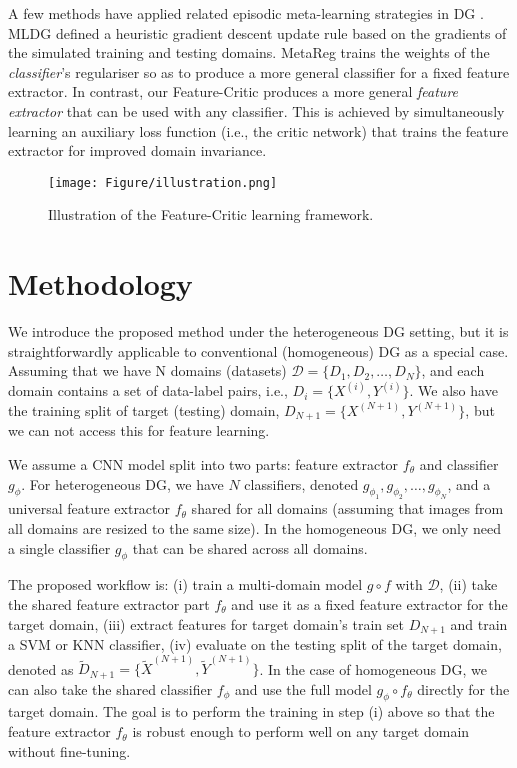 \documentclass{article}
\newcommand{\modelname}{Feature-Critic}
\begin{document}
A few methods have applied related episodic meta-learning strategies in DG \cite{Li18,Balaji18}. MLDG \cite{Li18} defined a heuristic gradient descent update rule based on the gradients of the simulated training and testing domains. MetaReg \cite{Balaji18} trains the weights of the \emph{classifier}'s regulariser so as to produce a more general classifier for a fixed feature extractor. In contrast,  our \modelname{} produces a more general \emph{feature extractor} that can be used with any classifier. This is achieved by simultaneously learning an auxiliary loss function \cite{gygli2017deepValueNet,yang2017metacritic} (i.e., the critic network) that trains the feature extractor for improved domain invariance.

\begin{figure}[t]
\centering
\texttt{[image: Figure/illustration.png]}
\caption{Illustration of the \modelname{} learning framework.} \label{fig:illu}
\vspace{-1.0em}
\end{figure}


\section{Methodology}

We  introduce the proposed method under the heterogeneous DG setting, but it is straightforwardly applicable to conventional (homogeneous) DG as a special case. Assuming that we have N domains (datasets) $\mathcal{D}=\{D_1, D_2, \dots, D_N\}$, and each domain contains a set of data-label pairs, i.e., $D_i=\{X^{(i)}, Y^{(i)}\}$. We also have the training split of target (testing) domain, $D_{N+1}=\{X^{(N+1)}, Y^{(N+1)}\}$, but  we can not access this for feature learning. 

We assume a CNN model split into two parts: feature extractor $f_\theta$ and classifier $g_\phi$. For heterogeneous DG, we have $N$ classifiers, denoted $g_{\phi_1}, g_{\phi_2}, \dots, g_{\phi_N}$, and a universal feature extractor $f_\theta$  shared for all domains (assuming that images from all domains are resized to the same size). In the homogeneous DG, we only need a single classifier $g_\phi$ that can be shared across all domains. 


The proposed workflow is: (i) train a multi-domain model $g\circ f$ with $\mathcal{D}$, (ii) take the shared feature extractor part $f_\theta$ and use it as a fixed feature extractor for the target domain, (iii) extract features for target domain's train set $D_{N+1}$ and train a SVM or KNN classifier, (iv) evaluate on the testing split of the target domain, denoted as $\tilde{D}_{N+1}=\{\tilde{X}^{(N+1)}, \tilde{Y}^{(N+1)}\}$. In the case of homogeneous DG, we can also take the shared classifier $f_\phi$ and use the full model $g_\phi \circ f_\theta$ directly for the target domain. The goal is to perform the training in step (i) above so that the feature extractor $f_\theta$ is robust enough to perform well on any target domain without fine-tuning.
\end{document}
